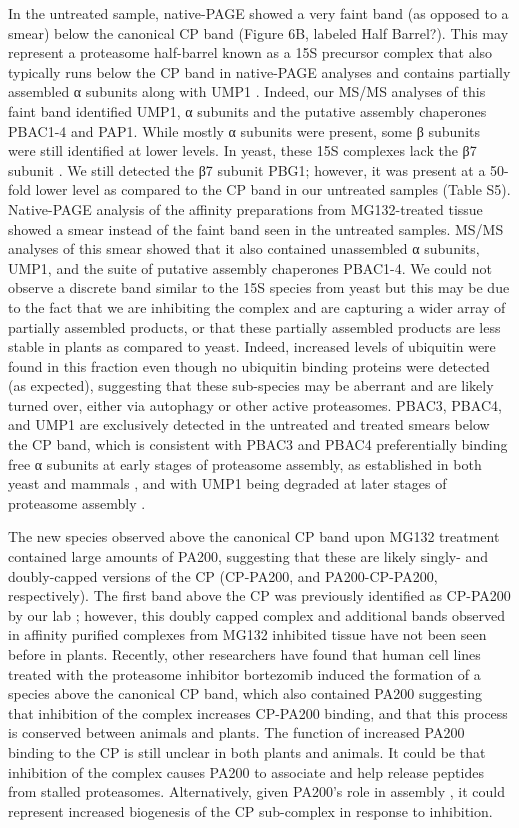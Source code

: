 In the untreated sample, native-PAGE showed a very faint band (as opposed to a smear) below the canonical CP band (Figure 6B, labeled Half Barrel?). This may represent a proteasome half-barrel known as a 15S precursor complex that also typically runs below the CP band in native-PAGE analyses and contains partially assembled α subunits along with UMP1 \citep{kock15}. Indeed, our MS/MS analyses of this faint band identified UMP1, α subunits and the putative assembly chaperones PBAC1-4 and PAP1. While mostly α subunits were present, some β subunits were still identified at lower levels. In yeast, these 15S complexes lack the β7 subunit \citep{kock15}. We still detected the β7 subunit PBG1; however, it was present at a 50-fold lower level as compared to the CP band in our untreated samples (Table S5). Native-PAGE analysis of the affinity preparations from MG132-treated tissue showed a smear instead of the faint band seen in the untreated samples. MS/MS analyses of this smear showed that it also contained unassembled α subunits, UMP1, and the suite of putative assembly chaperones PBAC1-4. We could not observe a discrete band similar to the 15S species from yeast but this may be due to the fact that we are inhibiting the complex and are capturing a wider array of partially assembled products, or that these partially assembled products are less stable in plants as compared to yeast. Indeed, increased levels of ubiquitin were found in this fraction even though no ubiquitin binding proteins were detected (as expected), suggesting that these sub-species may be aberrant and are likely turned over, either via autophagy or other active proteasomes. PBAC3, PBAC4, and UMP1 are exclusively detected in the untreated and treated smears below the CP band, which is consistent with PBAC3 and PBAC4 preferentially binding free α subunits at early stages of proteasome assembly, as established in both yeast and mammals \citep{kunjappu14}, and with UMP1 being degraded at later stages of proteasome assembly \citep{ramos98}.

The new species observed above the canonical CP band upon MG132 treatment contained large amounts of PA200, suggesting that these are likely singly- and doubly-capped versions of the CP (CP-PA200, and PA200-CP-PA200, respectively). The first band above the CP was previously identified as CP-PA200 by our lab \citep{book10}; however, this doubly capped complex and additional bands observed in affinity purified complexes from MG132 inhibited tissue have not been seen before in plants. Recently, other researchers have found that human cell lines treated with the proteasome inhibitor bortezomib induced the formation of a species above the canonical CP band, which also contained PA200 \citep{welk16} suggesting that inhibition of the complex increases CP-PA200 binding, and that this process is conserved between animals and plants. The function of increased PA200 binding to the CP is still unclear in both plants and animals. It could be that inhibition of the complex causes PA200 to associate and help release peptides from stalled proteasomes. Alternatively, given PA200’s role in assembly \citep{savulescu11}, it could represent increased biogenesis of the CP sub-complex in response to inhibition.


